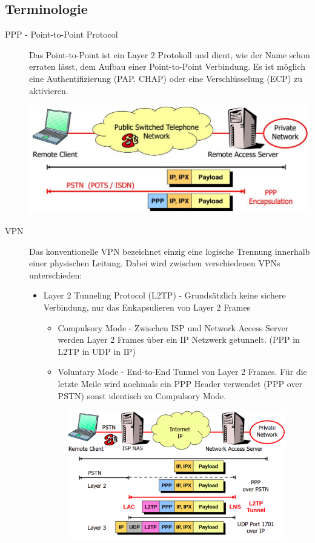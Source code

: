 \subsection{Terminologie}
\begin{description}
 \item [PPP - Point-to-Point Protocol] Das Point-to-Point ist ein Layer 2 Protokoll und dient, wie der Name schon erraten lässt, dem Aufbau einer Point-to-Point Verbindung. Es ist möglich eine Authentifizierung (PAP. CHAP) oder eine Verschlüsselung (ECP) zu aktivieren.
 \begin{minipage}[t]{0.6\textwidth}
		\centering
		\includegraphics[width=\linewidth]{images/ppp_remote_access}
	\end{minipage}
	\item[VPN] Das konventionelle VPN bezeichnet einzig eine logische Trennung innerhalb einer physischen Leitung. Dabei wird zwischen verschiedenen VPNs unterschieden:
\begin{itemize}
        \item Layer 2 Tunneling Protocol (L2TP) - Grundsätzlich keine sichere Verbindung, nur das Enkapsulieren von Layer 2 Frames
	    \begin{itemize}
	        \item Compulsory Mode - Zwischen ISP und Network Access Server werden Layer 2 Frames über ein IP Netzwerk getunnelt. (PPP in L2TP in UDP in IP)
	        \item Voluntary Mode - End-to-End Tunnel von Layer 2 Frames. Für die letzte Meile wird nochmals ein PPP Header verwendet (PPP over PSTN) sonst identisch zu Compulsory Mode.
	    \end{itemize}
        \begin{figure}[ht!]
        	\centering
        	\begin{minipage}[t]{0.4\textwidth}
        		\centering
        		\includegraphics[width=\linewidth]{images/l2tp-compulsary-mode.png}

\end{minipage}
\end{figure}
\end{itemize}
\end{description}
